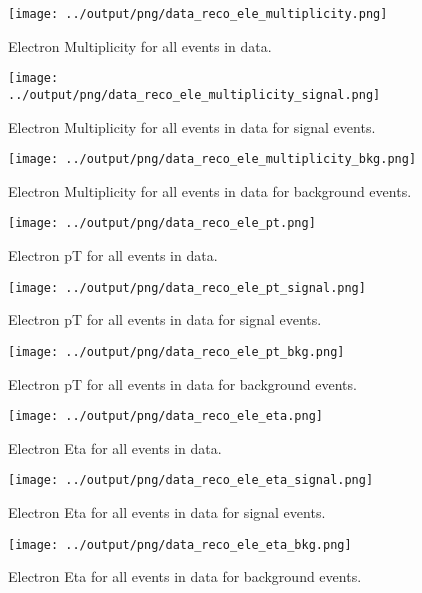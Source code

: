 \documentclass[11pt]{book}
\begin{document}
\begin{figure}[htb]
\centering
\texttt{[image: ../output/png/data\_reco\_ele\_multiplicity.png]}
\caption{Electron Multiplicity for all events in data.}
\label{fig:data_ele_multiplicity}
\end{figure}

\begin{figure}[htb]
\centering
\texttt{[image: ../output/png/data\_reco\_ele\_multiplicity\_signal.png]}
\caption{Electron Multiplicity for all events in data for signal events.}
\label{fig:data_ele_multiplicity_signal}
\end{figure}

\begin{figure}[htb]
\centering
\texttt{[image: ../output/png/data\_reco\_ele\_multiplicity\_bkg.png]}
\caption{Electron Multiplicity for all events in data for background events.}
\label{fig:data_ele_multiplicity_bkg}
\end{figure}


\begin{figure}[htb]
\centering
\texttt{[image: ../output/png/data\_reco\_ele\_pt.png]}
\caption{Electron pT for all events in data.}
\label{fig:data_ele_pt}
\end{figure}

\begin{figure}[htb]
\centering
\texttt{[image: ../output/png/data\_reco\_ele\_pt\_signal.png]}
\caption{Electron pT for all events in data for signal events.}
\label{fig:data_ele_pt_signal}
\end{figure}

\begin{figure}[htb]
\centering
\texttt{[image: ../output/png/data\_reco\_ele\_pt\_bkg.png]}
\caption{Electron pT for all events in data for background events.}
\label{fig:data_ele_pt_bkg}
\end{figure}


\begin{figure}[htb]
\centering
\texttt{[image: ../output/png/data\_reco\_ele\_eta.png]}
\caption{Electron Eta for all events in data.}
\label{fig:data_ele_eta}
\end{figure}

\begin{figure}[htb]
\centering
\texttt{[image: ../output/png/data\_reco\_ele\_eta\_signal.png]}
\caption{Electron Eta for all events in data for signal events.}
\label{fig:data_ele_eta_signal}
\end{figure}

\begin{figure}[htb]
\centering
\texttt{[image: ../output/png/data\_reco\_ele\_eta\_bkg.png]}
\caption{Electron Eta for all events in data for background events.}
\label{fig:data_ele_eta_bkg}
\end{figure}
\end{document}
